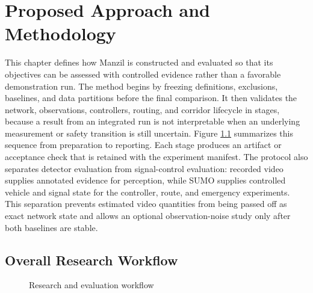 \chapter{Proposed Approach and Methodology}
\label{ch:method}

This chapter defines how Manzil is constructed and evaluated so that its objectives can be assessed with controlled evidence rather than a favorable demonstration run. The method begins by freezing definitions, exclusions, baselines, and data partitions before the final comparison. It then validates the network, observations, controllers, routing, and corridor lifecycle in stages, because a result from an integrated run is not interpretable when an underlying measurement or safety transition is still uncertain. Figure \ref{fig:method-workflow} summarizes this sequence from preparation to reporting. Each stage produces an artifact or acceptance check that is retained with the experiment manifest. The protocol also separates detector evaluation from signal-control evaluation: recorded video supplies annotated evidence for perception, while SUMO supplies controlled vehicle and signal state for the controller, route, and emergency experiments. This separation prevents estimated video quantities from being passed off as exact network state and allows an optional observation-noise study only after both baselines are stable.

\section{Overall Research Workflow}

\begin{figure}[htbp]
\centering
{}
\caption{Research and evaluation workflow}
\label{fig:method-workflow}
\end{figure}

